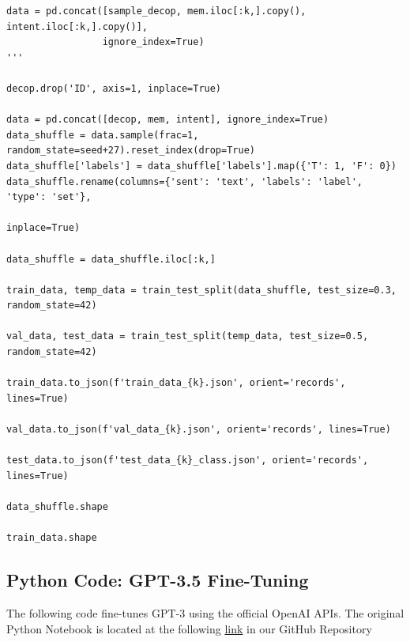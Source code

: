\documentclass[10pt,twocolumn,letterpaper]{article}
\begin{document}
\begin{verbatim}
data = pd.concat([sample_decop, mem.iloc[:k,].copy(), intent.iloc[:k,].copy()],
                 ignore_index=True)
'''

decop.drop('ID', axis=1, inplace=True)

data = pd.concat([decop, mem, intent], ignore_index=True)
data_shuffle = data.sample(frac=1, random_state=seed+27).reset_index(drop=True)
data_shuffle['labels'] = data_shuffle['labels'].map({'T': 1, 'F': 0})
data_shuffle.rename(columns={'sent': 'text', 'labels': 'label', 'type': 'set'}, 
                                                                        inplace=True)

data_shuffle = data_shuffle.iloc[:k,]

train_data, temp_data = train_test_split(data_shuffle, test_size=0.3, random_state=42)

val_data, test_data = train_test_split(temp_data, test_size=0.5, random_state=42)

train_data.to_json(f'train_data_{k}.json', orient='records', lines=True)

val_data.to_json(f'val_data_{k}.json', orient='records', lines=True)

test_data.to_json(f'test_data_{k}_class.json', orient='records', lines=True)

data_shuffle.shape

train_data.shape
\end{verbatim}

\subsection{Python Code: GPT-3.5 Fine-Tuning}

The following code fine-tunes GPT-3 using the official OpenAI APIs.
The original Python Notebook is located at the following \href{https://colab.research.google.com/github/TannerAGraves/GPT-LieDetection/blob/main/gpt3.5/API_scratch.ipynb}{link} in our GitHub Repository
\end{document}
